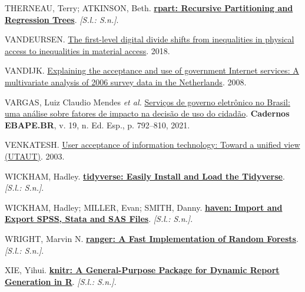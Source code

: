 \documentclass[
  man,
  floatsintext,
  longtable,
  a4paper,
  nolmodern,
  notxfonts,
  notimes,
  colorlinks=true,linkcolor=blue,citecolor=blue,urlcolor=blue]{apa7}
\newlength{\cslhangindent}
\newenvironment{CSLReferences}[2] %
 {\begin{list}{}{%
  \setlength{\itemindent}{0pt}
  \setlength{\leftmargin}{0pt}
  \setlength{\parsep}{0pt}
  \ifodd #1
   \setlength{\leftmargin}{\cslhangindent}
   \setlength{\itemindent}{-1\cslhangindent}
  \fi
  \setlength{\itemsep}{#2\baselineskip}}}
 {\end{list}}
\begin{document}
\begin{CSLReferences}{0}{1}
THERNEAU, Terry; ATKINSON, Beth.
\textbf{\href{https://github.com/bethatkinson/rpart}{rpart: Recursive
Partitioning and Regression Trees}}. \emph{{[}S.l.: S.n.{]}}.

VANDEURSEN. \href{https://doi.org/10.1177/1461444818797082}{The
first-level digital divide shifts from inequalities in physical access
to inequalities in material access}. 2018.

VANDIJK. \href{https://doi.org/10.1016/j.giq.2007.09.006}{Explaining the
acceptance and use of government Internet services: A multivariate
analysis of 2006 survey data in the Netherlands}. 2008.

VARGAS, Luiz Claudio Mendes \emph{et al.}
\href{https://doi.org/10.1590/1679-395120200206}{Serviços de governo
eletrônico no {B}rasil: uma análise sobre fatores de impacto na decisão
de uso do cidadão}. \textbf{Cadernos {EBAPE.BR}}, v. 19, n. Ed. Esp., p.
792--810, 2021.

VENKATESH. \href{https://doi.org/10.2307/30036540}{User acceptance of
information technology: Toward a unified view (UTAUT)}. 2003.

WICKHAM, Hadley.
\textbf{\href{https://tidyverse.tidyverse.org}{tidyverse: Easily Install
and Load the Tidyverse}}. \emph{{[}S.l.: S.n.{]}}.

WICKHAM, Hadley; MILLER, Evan; SMITH, Danny.
\textbf{\href{https://haven.tidyverse.org}{haven: Import and Export
SPSS, Stata and SAS Files}}. \emph{{[}S.l.: S.n.{]}}.

WRIGHT, Marvin N.
\textbf{\href{https://imbs-hl.github.io/ranger/}{ranger: A Fast
Implementation of Random Forests}}. \emph{{[}S.l.: S.n.{]}}.

XIE, Yihui. \textbf{\href{https://yihui.org/knitr/}{knitr: A
General-Purpose Package for Dynamic Report Generation in R}}.
\emph{{[}S.l.: S.n.{]}}.

\end{CSLReferences}
\end{document}

